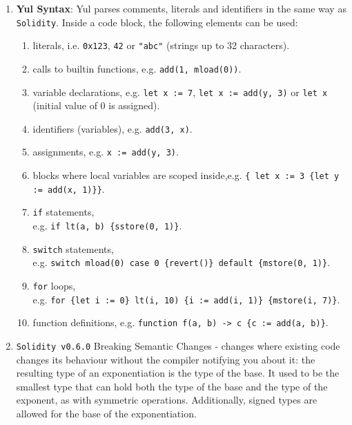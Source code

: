 \begin{enumerate}
\item\textbf{Yul Syntax}: Yul parses comments, literals and identifiers in the same way as \verb|Solidity|. Inside a code block, the following elements can be used:
    \begin{enumerate}
	\item literals, i.e. \verb|0x123|, \verb|42| or \verb|"abc"| (strings up to 32 characters).
	\item calls to builtin functions, e.g. \verb|add(1, mload(0))|.
	\item variable declarations, e.g. \verb|let x := 7|, \verb|let x := add(y, 3)| or \verb|let x| (initial value of 0 is assigned).
	\item identifiers (variables), e.g. \verb|add(3, x)|.
	\item assignments, e.g. \verb|x := add(y, 3)|.
	\item blocks where local variables are scoped inside,\linebreak e.g. \verb|{ let x := 3 {let y := add(x, 1)}}|.
	\item\verb|if| statements,\\e.g. \verb|if lt(a, b) {sstore(0, 1)}|.
	\item\verb|switch| statements,\\e.g. \verb|switch mload(0) case 0 {revert()} default {mstore(0, 1)}|.
	\item\verb|for| loops,\\e.g. \verb|for {let i := 0} lt(i, 10) {i := add(i, 1)} {mstore(i, 7)}|.
	\item function definitions, e.g. \verb|function f(a, b) -> c {c := add(a, b)}|.
    \end{enumerate}

\item\verb|Solidity v0.6.0| Breaking Semantic Changes - changes where existing code changes its behaviour without the compiler notifying you about it: the resulting type of an exponentiation is the type of the base. It used to be the smallest type that can hold both the type of the base and the type of the exponent, as with symmetric operations. Additionally, signed types are allowed for the base of the exponentiation.


\end{enumerate}
